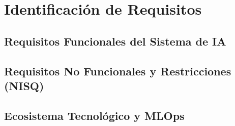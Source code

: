 \chapter{Identificación de Requisitos}\label{ch:requisitos}

\section{Requisitos Funcionales del Sistema de IA}

\section{Requisitos No Funcionales y Restricciones (NISQ)}

\section{Ecosistema Tecnológico y MLOps}

